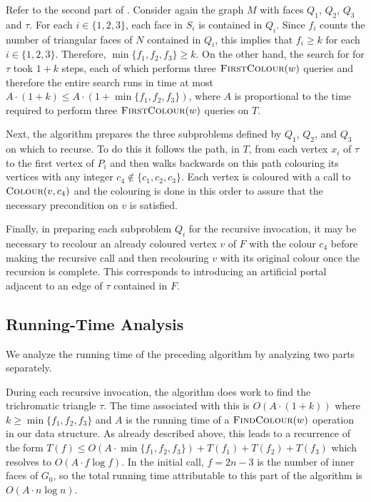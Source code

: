 \documentclass[kpfonts]{patmorin}
\let\le\leqslant
\let\ge\geqslant
\begin{document}
Refer to the second part of . Consider again the graph $M$ with faces $Q_1$, $Q_2$, $Q_3$ and $\tau$. For each $i\in\{1,2,3\}$, each face in $S_i$ is contained in $Q_i$.  Since $f_i$ counts the number of triangular faces of $N$ contained in $Q_i$, this implies that $f_i\ge k$ for each $i\in \{1,2,3\}$.  Therefore, $\min\{f_1,f_2,f_3\}\ge k$.  On the other hand, the search for for $\tau$ took $1+k$ steps, each of which performs three $\textsc{FirstColour}(w)$ queries and therefore the entire search runs in time at most $A\cdot(1+k)\le A\cdot(1+\min\{f_1,f_2,f_3\})$, where $A$ is proportional to the time required to perform three $\textsc{FirstColour}(w)$ queries on $T$.

Next, the algorithm prepares the three subproblems defined by $Q_1$, $Q_2$, and $Q_3$ on which to recurse.  To do this it follows the path, in $T$, from each vertex $x_i$ of $\tau$ to the first vertex of $P_i$ and then walks backwards on this path colouring its vertices with any integer $c_4\not\in\{c_1,c_2,c_3\}$.  Each vertex is coloured with a call to $\textsc{Colour}(v,c_4)$ and the colouring is done in this order to assure that the necessary precondition on $v$ is satisfied.

Finally, in preparing each subproblem $Q_i$ for the recursive invocation, it may be necessary to recolour an already coloured vertex $v$ of $F$ with the colour $c_4$ before making the recursive call and then recolouring $v$ with its original colour once the recursion is complete.  This corresponds to introducing an artificial portal adjacent to an edge of $\tau$ contained in $F$.

\subsection{Running-Time Analysis}

We analyze the running time of the preceding algorithm by analyzing two parts separately.

During each recursive invocation, the algorithm does work to find the trichromatic triangle $\tau$.  The time associated with this is $O(A\cdot(1+k))$ where $k\ge \min\{f_1,f_2,f_3\}$ and $A$ is the running time of a $\textsc{FindColour}(w)$ operation in our data structure.  As already described above, this leads to a recurrence of the form $T(f) \le O(A\cdot\min\{f_1,f_2,f_3\}) + T(f_1)+T(f_2)+T(f_3)$ which resolves to $O(A\cdot f\log f)$.  In the initial call, $f=2n-3$ is the number of inner faces of $G_0$, so the total running time attributable to this part of the algorithm is $O(A\cdot n\log n)$.
\end{document}
